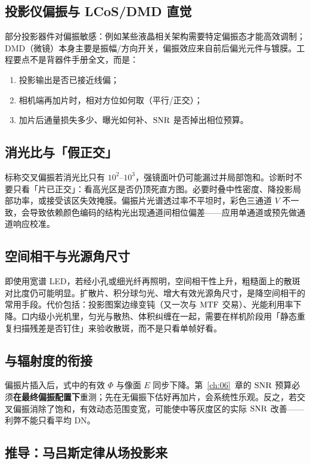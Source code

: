 \subsection{投影仪偏振与 LCoS/DMD 直觉}

部分投影器件对偏振敏感：例如某些液晶相关架构需要特定偏振态才能高效调制；DMD（微镜）本身主要是振幅/方向开关，偏振效应来自前后偏光元件与镀膜。工程要点不是背器件手册全文，而是：
\begin{enumerate}
  \item 投影输出是否已接近线偏；
  \item 相机端再加片时，相对方位如何取（平行/正交）；
  \item 加片后通量损失多少、曝光如何补、$\mathrm{SNR}$ 是否掉出相位预算。
\end{enumerate}


\subsection{消光比与「假正交」}

标称交叉偏振若消光比只有 $10^{2}$--$10^{3}$，强镜面叶仍可能漏过并局部饱和。诊断时不要只看「片已正交」：看高光区是否仍顶死直方图。必要时叠中性密度、降投影局部功率，或接受该区失效掩膜。偏振片光谱透过率不平坦时，彩色三通道 $V$ 不一致，会导致依赖颜色编码的结构光出现通道间相位偏差——应用单通道或预先做通道响应校准。

\subsection{空间相干与光源角尺寸}

即使用宽谱 LED，若经小孔或细光纤再照明，空间相干性上升，粗糙面上的散斑对比度仍可能明显。扩散片、积分球匀光、增大有效光源角尺寸，是降空间相干的常用手段。代价包括：投影图案边缘变钝（又一次与 $\mathrm{MTF}$ 交易）、光能利用率下降。口内级小光机里，匀光与散热、体积纠缠在一起，需要在样机阶段用「静态重复扫描残差是否钉住」来验收散斑，而不是只看单帧好看。

\subsection{与辐射度的衔接}

偏振片插入后，式中的有效 $\Phi$ 与像面 $E$ 同步下降。第~\ref{ch:06}~章的 $\mathrm{SNR}$ 预算必须\textbf{在最终偏振配置下}重测；先在无偏振下估好再加片，会系统性乐观。反之，若交叉偏振消除了饱和，有效动态范围变宽，可能使中等灰度区的实际 $\mathrm{SNR}$ 改善——利弊不能只看平均 DN。

\subsection{推导：马吕斯定律从场投影来}

